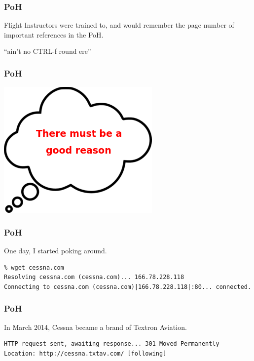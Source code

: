 \begin{frame}
\frametitle{PoH}
\begin{center}
Flight Instructors were trained to, and would remember the page number of important references in the PoH.
\end{center}
\begin{center}
\tiny{``ain't no CTRL-f \textquotesingle round \textquotesingle ere''}
\end{center}
\end{frame}

\begin{frame}
\frametitle{PoH}
\begin{center}
\includegraphics[height=0.5\textheight]{image/thought-bubble-there-must-be-a-good-reason.png}
\end{center}
\end{frame}

\begin{frame}[fragile]
\frametitle{PoH}
\begin{center}
One day, I started poking around.
\tiny{
\begin{lstlisting}
% wget cessna.com
Resolving cessna.com (cessna.com)... 166.78.228.118
Connecting to cessna.com (cessna.com)|166.78.228.118|:80... connected.
\end{lstlisting}
}
\end{center}
\end{frame}

\begin{frame}[fragile]
\frametitle{PoH}
\begin{center}
In March 2014, Cessna became a brand of Textron Aviation.
\tiny{
\begin{lstlisting}
HTTP request sent, awaiting response... 301 Moved Permanently
Location: http://cessna.txtav.com/ [following]
\end{lstlisting}
}
\end{center}
\end{frame}

